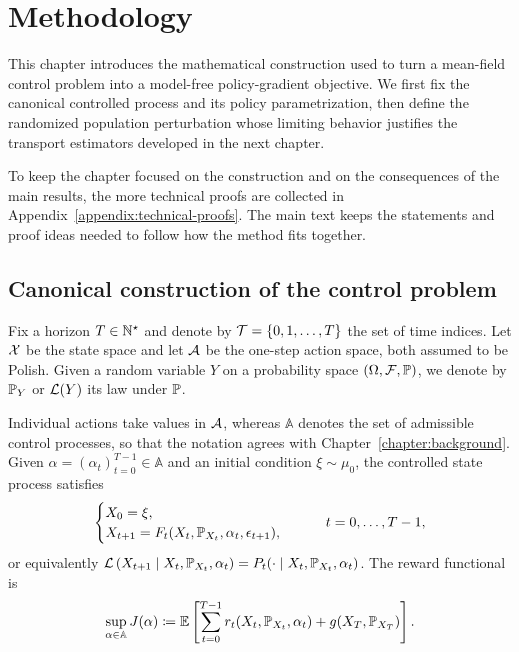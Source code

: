 \chapter{Methodology}
\label{chapter:methodology}

This chapter introduces the mathematical construction used to turn a mean-field control problem into a model-free policy-gradient objective. We first fix the canonical controlled process and its policy parametrization, then define the randomized population perturbation whose limiting behavior justifies the transport estimators developed in the next chapter.

To keep the chapter focused on the construction and on the consequences of the main results, the more technical proofs are collected in Appendix~\ref{appendix:technical-proofs}. The main text keeps the statements and proof ideas needed to follow how the method fits together.

\section{Canonical construction of the control problem}
\label{sec:canonical-construction}

Fix a horizon $T\in\N^\star$ and denote by $\Tc=\{0,1,\ldots,T\}$ the set of time indices. Let $\Xc$ be the state space and let $\Ac$ be the one-step action space, both assumed to be Polish. Given a random variable $Y$ on a probability space $(\Omega,\Fc,\P)$, we denote by $\P_Y$ or $\Lc(Y)$ its law under $\P$.

Individual actions take values in $\Ac$, whereas $\mathbb A$ denotes the set of admissible control processes, so that the notation agrees with Chapter~\ref{chapter:background}. Given $\alpha=(\alpha_t)_{t=0}^{T-1}\in\mathbb A$ and an initial condition $\xi\sim\mu_0$, the controlled state process satisfies
\begin{align}
    \begin{cases}
        X_0=\xi,\\
        X_{t+1}=F_t(X_t,\P_{X_t},\alpha_t,\epsilon_{t+1}),
    \end{cases}
    \qquad t=0,\ldots,T-1,
\end{align}
or equivalently $\Lc\left(X_{t+1}\mid X_t,\P_{X_t},\alpha_t\right)=P_t(\cdot\mid X_t,\P_{X_t},\alpha_t)$. The reward functional is
\begin{align}
    \label{eq:methodology-control_problem}
    \sup_{\alpha\in\mathbb A}
    J(\alpha)
    \coloneqq
    \E\left[
        \sum_{t=0}^{T-1} r_t(X_t,\P_{X_t},\alpha_t)
        +g(X_T,\P_{X_T})
    \right].
\end{align}

